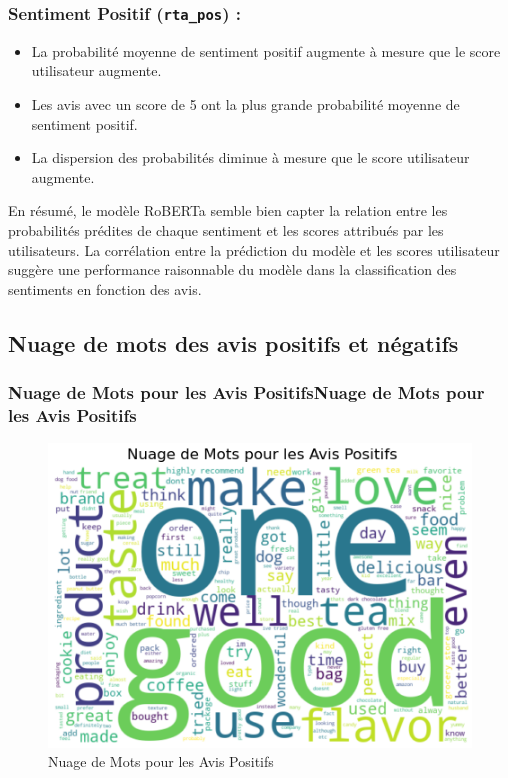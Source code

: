 \subsubsection{Sentiment Positif (\texttt{rta\_pos}) :}

\begin{itemize}
    \item La probabilité moyenne de sentiment positif augmente à mesure que le score utilisateur augmente.
    \item Les avis avec un score de 5 ont la plus grande probabilité moyenne de sentiment positif.
    \item La dispersion des probabilités diminue à mesure que le score utilisateur augmente.
\end{itemize}

En résumé, le modèle RoBERTa semble bien capter la relation entre les probabilités prédites de chaque sentiment et les scores attribués par les utilisateurs. La corrélation entre la prédiction du modèle et les scores utilisateur suggère une performance raisonnable du modèle dans la classification des sentiments en fonction des avis.



\subsection{Nuage de mots des avis positifs et négatifs}


\subsubsection{Nuage de Mots pour les Avis PositifsNuage de Mots pour les Avis Positifs}
\begin{figure}[h]
    \centering
    \includegraphics[scale=0.5]{assets/wordcloudpositive.PNG}
    \caption{Nuage de Mots pour les Avis Positifs}
    \label{fig:nuagepositive}
\end{figure}


